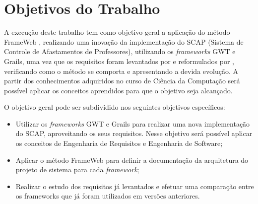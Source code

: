
\section{Objetivos do Trabalho}
\label{sec-objetivos}


A execução deste trabalho tem como objetivo geral a aplicação do método FrameWeb \cite{souza:masterthesis07}, realizando uma inovação da implementação do SCAP (Sistema de Controle de Afastamentos de Professores), utilizando os \textit{frameworks} GWT e Grails, uma vez que os requisitos foram levantados por  e reformulados por , verificando como o método se comporta e apresentando a devida evolução. A partir dos conhecimentos adquiridos no curso de Ciência da Computação será possível aplicar os conceitos aprendidos para que o objetivo seja alcançado.

O objetivo geral pode ser subdividido nos seguintes objetivos específicos:

\begin{itemize}

	\item Utilizar os \textit{frameworks} GWT e Grails para realizar uma nova implementação do SCAP, aproveitando os seus requisitos. Nesse objetivo será possível aplicar os conceitos de Engenharia de Requisitos e Engenharia de Software;
	\item Aplicar o método FrameWeb para definir a documentação da arquitetura do projeto de sistema para cada \textit{framework};
    \item Realizar o estudo dos requisitos já levantados e efetuar uma comparação entre os frameworks que já foram utilizados em versões anteriores.

\end{itemize}
